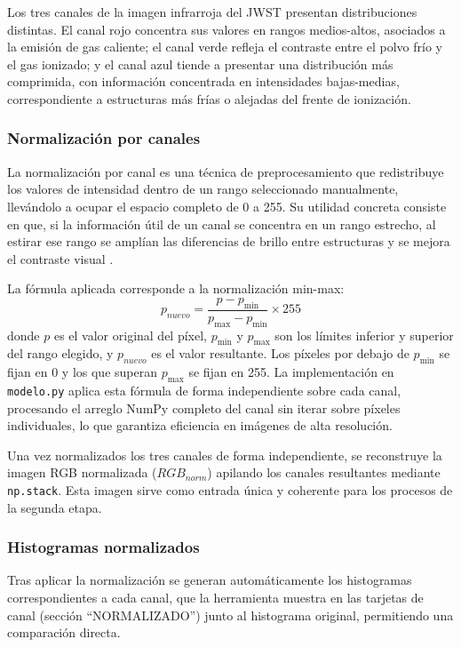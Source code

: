 \documentclass[11pt]{article}
\begin{document}
Los tres canales de la imagen infrarroja del JWST presentan distribuciones distintas. El canal rojo concentra sus valores en rangos medios-altos, asociados a la emisión de gas caliente; el canal verde refleja el contraste entre el polvo frío y el gas ionizado; y el canal azul tiende a presentar una distribución más comprimida, con información concentrada en intensidades bajas-medias, correspondiente a estructuras más frías o alejadas del frente de ionización.

\subsubsection{Normalización por canales}

La normalización por canal es una técnica de preprocesamiento que redistribuye los valores de intensidad dentro de un rango seleccionado manualmente, llevándolo a ocupar el espacio completo de 0 a 255. Su utilidad concreta consiste en que, si la información útil de un canal se concentra en un rango estrecho, al estirar ese rango se amplían las diferencias de brillo entre estructuras y se mejora el contraste visual \cite{gonzalez}.

La fórmula aplicada corresponde a la normalización min-max:
\begin{equation}
    p_{nuevo} = \frac{p - p_{\min}}{p_{\max} - p_{\min}} \times 255
    \label{eq:normalizacion}
\end{equation}
donde $p$ es el valor original del píxel, $p_{\min}$ y $p_{\max}$ son los límites inferior y superior del rango elegido, y $p_{nuevo}$ es el valor resultante. Los píxeles por debajo de $p_{\min}$ se fijan en 0 y los que superan $p_{\max}$ se fijan en 255. La implementación en \texttt{modelo.py} aplica esta fórmula de forma independiente sobre cada canal, procesando el arreglo NumPy completo del canal sin iterar sobre píxeles individuales, lo que garantiza eficiencia en imágenes de alta resolución.

Una vez normalizados los tres canales de forma independiente, se reconstruye la imagen RGB normalizada ($RGB_{norm}$) apilando los canales resultantes mediante \texttt{np.stack}. Esta imagen sirve como entrada única y coherente para los procesos de la segunda etapa.

\subsubsection{Histogramas normalizados}

Tras aplicar la normalización se generan automáticamente los histogramas correspondientes a cada canal, que la herramienta muestra en las tarjetas de canal (sección ``NORMALIZADO'') junto al histograma original, permitiendo una comparación directa.
\end{document}
